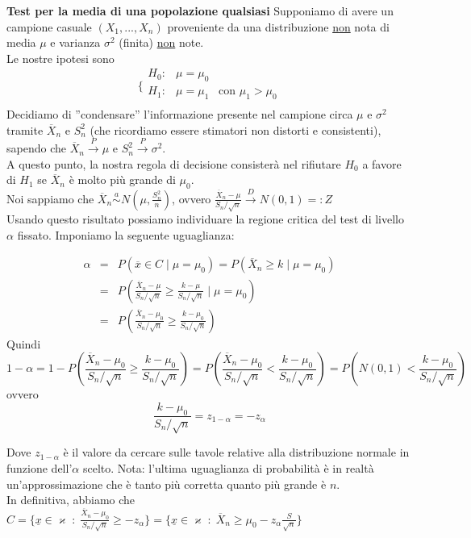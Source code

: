 \textbf{Test per la media di una popolazione qualsiasi} Supponiamo di avere un campione casuale $(X_1,...,X_n)$ proveniente da una distribuzione \underline{non} nota di media $\mu$ e varianza $\sigma^2$ (finita) \underline{non} note.\\
Le nostre ipotesi sono 
$$\bigg \{
\begin{array}{rl}
H_0: & \mu=\mu_0 \\
H_1: & \mu=\mu_1 \; \; \; \text{con } \mu_1>\mu_0 \\
\end{array}
$$
Decidiamo di ''condensare'' l'informazione presente nel campione circa $\mu$ e $\sigma^2$ tramite $\overline{X}_n$ e $S_n^2$ (che ricordiamo essere stimatori non distorti e consistenti), sapendo che $\overline{X}_n \stackrel{P}{\rightarrow} \mu$ e $S_n^2 \stackrel{P}{\rightarrow} \sigma^2$.\\
A questo punto, la nostra regola di decisione consisterà nel rifiutare $H_0$ a favore di $H_1$ se $\overline{X}_n$ è molto più grande di $\mu_0$.\\
Noi sappiamo che $\overline{X}_n \stackrel{a}{\sim} N \left( \mu, \frac{S_n^2}{n}\right)$, ovvero $\frac{\overline{X}_n-\mu}{S_n/\sqrt{n}} \stackrel{D}{\rightarrow} N(0,1) =: Z$\\
Usando questo risultato possiamo individuare la regione critica del test di livello $\alpha$ fissato. Imponiamo la seguente uguaglianza:

\begin{eqnarray*}
\alpha 	&=& P(\overline{x} \in C \mid \mu=\mu_0) = P(\overline{X}_n \geq k \mid \mu=\mu_0) \\
		&=& P \left( \frac{\overline{X}_n-\mu}{S_n/\sqrt{n}} \geq \frac{k-\mu}{S_n/\sqrt{n}} \mid \mu=\mu_0 \right) \\
		&=& P \left( \frac{\overline{X}_n-\mu_0}{S_n/\sqrt{n}} \geq \frac{k-\mu_0}{S_n/\sqrt{n}} \right)
\end{eqnarray*}
Quindi 
$$1-\alpha = 1- P \left( \frac{\overline{X}_n-\mu_0}{S_n/\sqrt{n}} \geq \frac{k-\mu_0}{S_n/\sqrt{n}} \right) = P \left( \frac{\overline{X}_n-\mu_0}{S_n/\sqrt{n}} < \frac{k-\mu_0}{S_n/\sqrt{n}} \right) = P \left( N(0,1) < \frac{k-\mu_0}{S_n/\sqrt{n}} \right)$$
ovvero
$$\frac{k-\mu_0}{S_n/\sqrt{n}}=z_{1-\alpha}=-z_{\alpha}$$

Dove $z_{1-\alpha}$ è il valore da cercare sulle tavole relative alla distribuzione normale in funzione dell'$\alpha$ scelto. Nota: l'ultima uguaglianza di probabilità è in realtà un'approssimazione che è tanto più corretta quanto più grande è $n$.\\
In definitiva, abbiamo che $C = \lbrace \underline{x} \in \varkappa \; : \; \frac{\overline{X}_n-\mu_0}{S_n/\sqrt{n}} \geq -z_{\alpha} \rbrace = \lbrace \underline{x} \in \varkappa \; : \; \overline{X}_n \geq \mu_0 - z_{\alpha} \frac{S}{\sqrt{n}} \rbrace$\\

